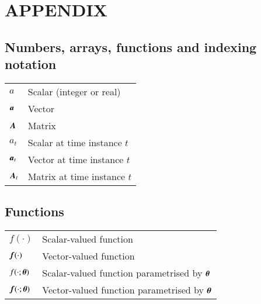 

\chapter*{APPENDIX}
\label{chap:Appendix}



\section*{Numbers, arrays, functions and indexing notation}

{
    \begin{tabular}{p{2cm}p{12.5cm}}
    $a$ 			& Scalar (integer or real) \\
    ${\bm{a}}$		    & Vector \\
    ${\bm{A}}$		    & Matrix \\
    $a_t$           & Scalar at time instance $t$ \\
    ${\bm{a}}_t$		    & Vector at time instance $t$\\
    ${\bm{A}}_t$		    & Matrix at time instance $t$\\
    \end{tabular}
}

\section*{Functions}

{
    \begin{tabular}{p{2cm}p{12.5cm}}
    $f(\cdot)$  	& Scalar-valued function \\
    ${\bm{f}}(\cdot)$	& Vector-valued function \\
    $f(\cdot; {\bm{\theta}})$ & Scalar-valued function parametrised by ${\bm{\theta}}$ \\
    ${\bm{f}}(\cdot; {\bm{\theta}})$ & Vector-valued function parametrised by ${\bm{\theta}}$ \\
    \end{tabular}
}


